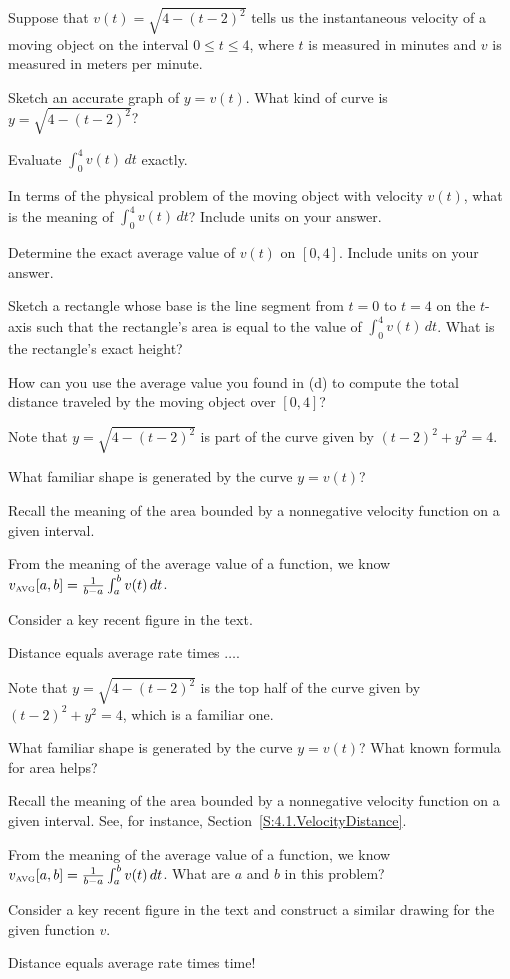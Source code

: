 \begin{activity} \label{A:4.3.3}  Suppose that $v(t) = \sqrt{4-(t-2)^2}$ tells us the instantaneous velocity of a moving object on the interval $0 \le t \le 4$, where $t$ is measured in minutes and $v$ is measured in meters per minute.
\ba
\item Sketch an accurate graph of $y = v(t)$.  What kind of curve is $y = \sqrt{4-(t-2)^2}$?
\item Evaluate $\int_0^4 v(t) \, dt$ exactly.
\item In terms of the physical problem of the moving object with velocity $v(t)$, what is the meaning of $\int_0^4 v(t) \, dt$?  Include units on your answer.
\item Determine the exact average value of $v(t)$ on $[0,4]$.  Include units on your answer.
\item Sketch a rectangle whose base is the line segment from $t=0$ to $t = 4$ on the $t$-axis such that the rectangle's area is equal to the value of $\int_0^4 v(t) \, dt$.  What is the rectangle's exact height?
\item How can you use the average value you found in (d) to compute the total distance traveled by the moving object over $[0,4]$?
\ea
\end{activity}
\begin{smallhint}
\ba
	\item Note that $y = \sqrt{4-(t-2)^2}$ is part of the curve given by $(t-2)^2 + y^2 = 4$.
	\item What familiar shape is generated by the curve $y = v(t)$?
	\item Recall the meaning of the area bounded by a nonnegative velocity function on a given interval.
	\item From the meaning of the average value of a function, we know $v_{\mbox{\tiny{AVG}}}[a,b] = \frac{1}{b-a}  \int_a^b v(t) \, dt$.
	\item Consider a key recent figure in the text.
	\item Distance equals average rate times $\ldots$.
\ea
\end{smallhint}
\begin{bighint}
\ba
	\item Note that $y = \sqrt{4-(t-2)^2}$ is the top half of the curve given by $(t-2)^2 + y^2 = 4$, which is a familiar one.
	\item What familiar shape is generated by the curve $y = v(t)$?  What known formula for area helps?
	\item Recall the meaning of the area bounded by a nonnegative velocity function on a given interval.  See, for instance, Section~\ref{S:4.1.VelocityDistance}.
	\item From the meaning of the average value of a function, we know $v_{\mbox{\tiny{AVG}}}[a,b] = \frac{1}{b-a}  \int_a^b v(t) \, dt$.  What are $a$ and $b$ in this problem?
	\item Consider a key recent figure in the text and construct a similar drawing for the given function $v$.
	\item Distance equals average rate times time!
\ea
\end{bighint}
